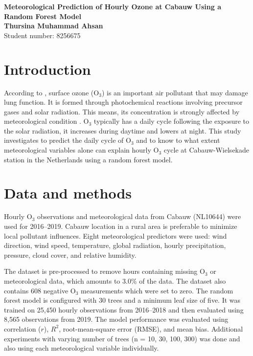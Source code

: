 \documentclass[10pt,a4paper]{article}
\begin{document}
\begin{center}
    {\Large \textbf{Meteorological Prediction of Hourly Ozone at Cabauw Using a Random Forest Model}}\\[0.3cm]
    \textbf{Thursina Muhammad Ahsan} \\
    Student number: 8256675
\end{center}

\section*{Introduction}

According to \citet{who2021}, surface ozone (O$_3$) is an important air pollutant that may damage lung function. It is formed through photochemical reactions involving precursor gases and solar radiation. This means, its concentration is strongly affected by meteorological condition \citep{otero2016}. O$_3$ typically has a daily cycle following the exposure to the solar radiation, it increases during daytime and lowers at night. This study investigates to predict the daily cycle of O$_3$ and to know to what extent meteorological variables alone can explain hourly O$_3$ cycle at Cabauw-Wielsekade station in the Netherlands using a random forest model.

\section*{Data and methods}

Hourly O$_3$ observations and meteorological data from Cabauw (NL10644) were used for 2016--2019. Cabauw location in a rural area is preferable to minimize local pollutant influences. Eight meteorological predictors were used: wind direction, wind speed, temperature, global radiation, hourly precipitation, pressure, cloud cover, and relative humidity.

The dataset is pre-processed to remove hours containing missing O$_3$ or meteorological data, which amounts to 3.0\% of the data. The dataset also contains 608 negative O$_3$ measurements which were set to zero. The random forest model is configured with 30 trees and a minimum leaf size of five. It was trained on 25,450 hourly observations from 2016--2018 and then evaluated using 8,565 observations from 2019. The model performance was evaluated using correlation ($r$), $R^2$, root-mean-square error (RMSE), and mean bias. Additional experiments with varying number of trees (n = 10, 30, 100, 300) was done and also using each meteorological variable individually.
\end{document}
